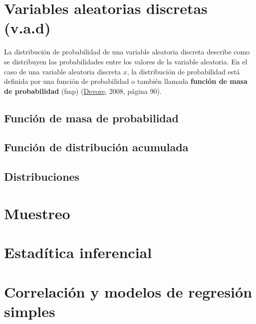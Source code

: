 \documentclass[
]{book}
\begin{document}
\hypertarget{variables-aleatorias-discretas-v.a.d}{%
\section{Variables aleatorias discretas (v.a.d)}\label{variables-aleatorias-discretas-v.a.d}}

La distribución de probabilidad de una variable aleatoria discreta describe como se distribuyen las probabilidades entre los valores de la variable aleatoria. En el caso de una variable aleatoria discreta \(x\), la distribución de probabilidad está definida por una función de probabilidad o también llamada \textbf{función de masa de probabilidad} (fmp) (\protect\hyperlink{ux5cux2520Referencias}{Devore}, 2008, página 90).

\hypertarget{funciuxf3n-de-masa-de-probabilidad}{%
\subsection{Función de masa de probabilidad}\label{funciuxf3n-de-masa-de-probabilidad}}

\hypertarget{funciuxf3n-de-distribuciuxf3n-acumulada}{%
\subsection{Función de distribución acumulada}\label{funciuxf3n-de-distribuciuxf3n-acumulada}}

\hypertarget{distribuciones}{%
\subsection{Distribuciones}\label{distribuciones}}

\hypertarget{muestreo}{%
\section{Muestreo}\label{muestreo}}

\hypertarget{estaduxedtica-inferencial}{%
\section{Estadítica inferencial}\label{estaduxedtica-inferencial}}

\hypertarget{correlaciuxf3n-y-modelos-de-regresiuxf3n-simples}{%
\section{Correlación y modelos de regresión simples}\label{correlaciuxf3n-y-modelos-de-regresiuxf3n-simples}}
\end{document}
